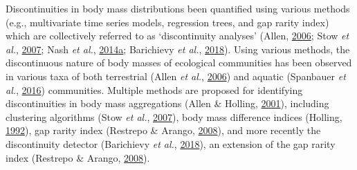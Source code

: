 \documentclass[12pt,twoside,openany]{reedthesis}
\begin{document}
Discontinuities in body mass distributions been quantified using various methods (e.g., multivariate time series models, regression trees, and gap rarity index) which are collectively referred to as `discontinuity analyses' (Allen, \protect\hyperlink{ref-allen2006discontinuities}{2006}; Stow \emph{et al.}, \protect\hyperlink{ref-stow2007evaluating}{2007}; Nash \emph{et al.}, \protect\hyperlink{ref-nash2014discontinuities}{2014}\protect\hyperlink{ref-nash2014discontinuities}{a}; Barichievy \emph{et al.}, \protect\hyperlink{ref-barichievy2018method}{2018}). Using various methods, the discontinuous nature of body masses of ecological communities has been observed in various taxa of both terrestrial (Allen \emph{et al.}, \protect\hyperlink{ref-allen2006patterns}{2006}) and aquatic (Spanbauer \emph{et al.}, \protect\hyperlink{ref-spanbauer2016body}{2016}) communities. Multiple methods are proposed for identifying discontinuities in body mass aggregations (Allen \& Holling, \protect\hyperlink{ref-allen2001cross}{2001}), including clustering algorithms (Stow \emph{et al.}, \protect\hyperlink{ref-stow2007evaluating}{2007}), body mass difference indices (Holling, \protect\hyperlink{ref-holling1992cross}{1992}), gap rarity index (Restrepo \& Arango, \protect\hyperlink{ref-restrepo2008discontinuities}{2008}), and more recently the discontinuity detector (Barichievy \emph{et al.}, \protect\hyperlink{ref-barichievy2018method}{2018}), an extension of the gap rarity index (Restrepo \& Arango, \protect\hyperlink{ref-restrepo2008discontinuities}{2008}).
\end{document}
